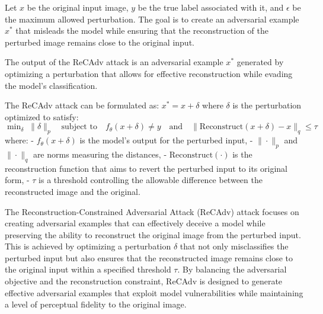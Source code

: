 Let $x$ be the original input image, $y$ be the true label associated with it, and $\epsilon$ be the maximum allowed perturbation. The goal is to create an adversarial example $x^*$ that misleads the model while ensuring that the reconstruction of the perturbed image remains close to the original input.

The output of the ReCAdv attack is an adversarial example $x^*$ generated by optimizing a perturbation that allows for effective reconstruction while evading the model's classification.

The ReCAdv attack can be formulated as:
$x^* = x + \delta$
where $\delta$ is the perturbation optimized to satisfy:
$\min_{\delta} \; \| \delta \|_p \quad \text{subject to} \quad f_\theta(x + \delta) \neq y \quad \text{and} \quad \| \text{Reconstruct}(x + \delta) - x \|_q \leq \tau$
where:
- $f_\theta(x + \delta)$ is the model's output for the perturbed input,
- $\| \cdot \|_p$ and $\| \cdot \|_q$ are norms measuring the distances,
- $\text{Reconstruct}(\cdot)$ is the reconstruction function that aims to revert the perturbed input to its original form,
- $\tau$ is a threshold controlling the allowable difference between the reconstructed image and the original.

The Reconstruction-Constrained Adversarial Attack (ReCAdv) attack focuses on creating adversarial examples that can effectively deceive a model while preserving the ability to reconstruct the original image from the perturbed input. This is achieved by optimizing a perturbation $\delta$ that not only misclassifies the perturbed input but also ensures that the reconstructed image remains close to the original input within a specified threshold $\tau$. By balancing the adversarial objective and the reconstruction constraint, ReCAdv is designed to generate effective adversarial examples that exploit model vulnerabilities while maintaining a level of perceptual fidelity to the original image.
